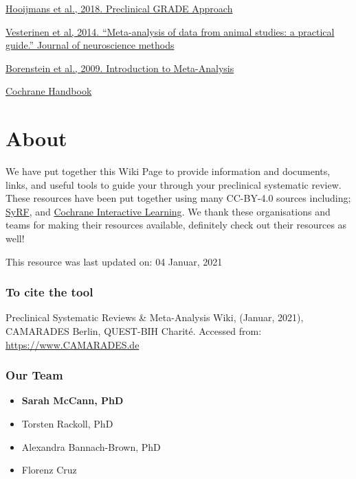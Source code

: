 \documentclass[
]{book}
\providecommand{\tightlist}{%
  \setlength{\itemsep}{0pt}\setlength{\parskip}{0pt}}
\begin{document}
\href{https://journals.plos.org/plosone/article?id=10.1371/journal.pone.0187271}{Hooijmans et al., 2018. Preclinical GRADE Approach}

\href{https://doi.org/10.1016/j.jneumeth.2013.09.010}{Vesterinen et al, 2014. ``Meta-analysis of data from animal studies: a practical guide.'' Journal of neuroscience methods}

\href{https://onlinelibrary.wiley.com/doi/book/10.1002/9780470743386}{Borenstein et al., 2009. Introduction to Meta-Analysis}

\href{https://handbook-5-1.cochrane.org/}{Cochrane Handbook}

\hypertarget{about}{%
\chapter{About}\label{about}}

We have put together this Wiki Page to provide information and documents, links, and useful tools to guide your through your preclinical systematic review. These resources have been put together using many CC-BY-4.0 sources including; \href{http://syrf.org.uk/}{SyRF}, and \href{https://training.cochrane.org/interactivelearning}{Cochrane Interactive Learning}. We thank these organisations and teams for making their resources available, definitely check out their resources as well!

This resource was last updated on: 04 Januar, 2021

\hypertarget{to-cite-the-tool}{%
\subsection{To cite the tool}\label{to-cite-the-tool}}

Preclinical Systematic Reviews \& Meta-Analysis Wiki, (Januar, 2021), CAMARADES Berlin, QUEST-BIH Charité. Accessed from: \url{https://www.CAMARADES.de}

\hypertarget{our-team}{%
\subsection{Our Team}\label{our-team}}

\begin{itemize}
\tightlist
\item
  \textbf{Sarah McCann, PhD}
\item
  Torsten Rackoll, PhD
\item
  Alexandra Bannach-Brown, PhD
\item
  Florenz Cruz
\end{itemize}
\end{document}
